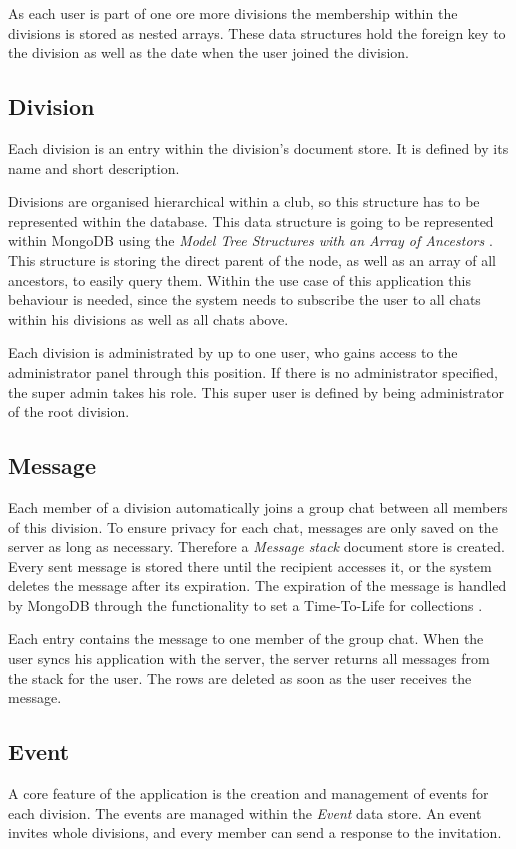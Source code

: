 As each user is part of one ore more divisions the membership within the divisions is stored as nested arrays. These data structures hold the foreign key to the division as well as the date when the user joined the division.

\subsection{Division}
Each division is an entry within the division's document store. It is defined by its name and short description.

Divisions are organised hierarchical within a club, so this structure has to be represented within the database. This data structure is going to be represented within MongoDB using the \emph{Model Tree Structures with an Array of Ancestors} \cite[p. 149]{Mongo:2014aa}. This structure is storing the direct parent of the node, as well as an array of all ancestors, to easily query them. Within the use case of this application this behaviour is needed, since the system needs to subscribe the user to all chats within his divisions as well as all chats above.

Each division is administrated by up to one user, who gains access to the administrator panel through this position. If there is no administrator specified, the super admin takes his role. This super user is defined by being administrator of the root division.

\subsection{Message}
Each member of a division automatically joins a group chat between all members of this division. To ensure privacy for each chat, messages are only saved on the server as long as necessary. Therefore a \emph{Message stack} document store is created. Every sent message is stored there until the recipient accesses it, or the system deletes the message after its expiration. The expiration of the message is handled by MongoDB through the functionality to set a Time-To-Life for collections \cite[p. 198]{Mongo:2014aa}.

Each entry contains the message to one member of the group chat. When the user syncs his application with the server, the server returns all messages from the stack for the user. The rows are deleted as soon as the user receives the message. 

\subsection{Event}
A core feature of the application is the creation and management of events for each division. The events are managed within the \emph{Event} data store. An event invites whole divisions, and every member can send a response to the invitation. 

